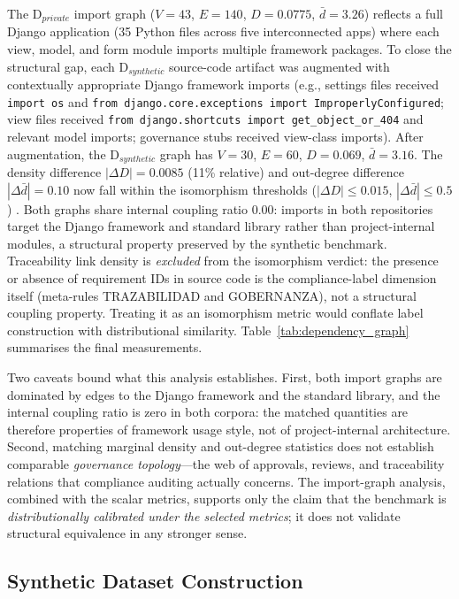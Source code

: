 \documentclass{ieeeaccess}
\begin{document}
The D$_{private}$ import graph ($V=43$, $E=140$, $D=0.0775$, $\bar{d}=3.26$) reflects a full Django application (35 Python files across five interconnected apps) where each view, model, and form module imports multiple framework packages. To close the structural gap, each D$_{synthetic}$ source-code artifact was augmented with contextually appropriate Django framework imports (e.g., settings files received \texttt{import os} and \texttt{from django.core.exceptions import ImproperlyConfigured}; view files received \texttt{from django.shortcuts import get\_object\_or\_404} and relevant model imports; governance stubs received view-class imports). After augmentation, the D$_{synthetic}$ graph has $V=30$, $E=60$, $D=0.069$, $\bar{d}=3.16$. The density difference $|\Delta D|=0.0085$ (11\% relative) and out-degree difference $|\Delta\bar{d}|=0.10$ now fall within the isomorphism thresholds ($|\Delta D|\leq0.015$, $|\Delta\bar{d}|\leq0.5$) \checkmark. Both graphs share internal coupling ratio 0.00: imports in both repositories target the Django framework and standard library rather than project-internal modules, a structural property preserved by the synthetic benchmark. Traceability link density is \emph{excluded} from the isomorphism verdict: the presence or absence of requirement IDs in source code is the compliance-label dimension itself (meta-rules TRAZABILIDAD and GOBERNANZA), not a structural coupling property. Treating it as an isomorphism metric would conflate label construction with distributional similarity. Table~\ref{tab:dependency_graph} summarises the final measurements.

Two caveats bound what this analysis establishes. First, both import graphs are dominated by edges to the Django framework and the standard library, and the internal coupling ratio is zero in both corpora: the matched quantities are therefore properties of framework usage style, not of project-internal architecture. Second, matching marginal density and out-degree statistics does not establish comparable \emph{governance topology}---the web of approvals, reviews, and traceability relations that compliance auditing actually concerns. The import-graph analysis, combined with the scalar metrics, supports only the claim that the benchmark is \emph{distributionally calibrated under the selected metrics}; it does not validate structural equivalence in any stronger sense.

\subsection{Synthetic Dataset Construction}
\label{sec:dataset}
\end{document}

